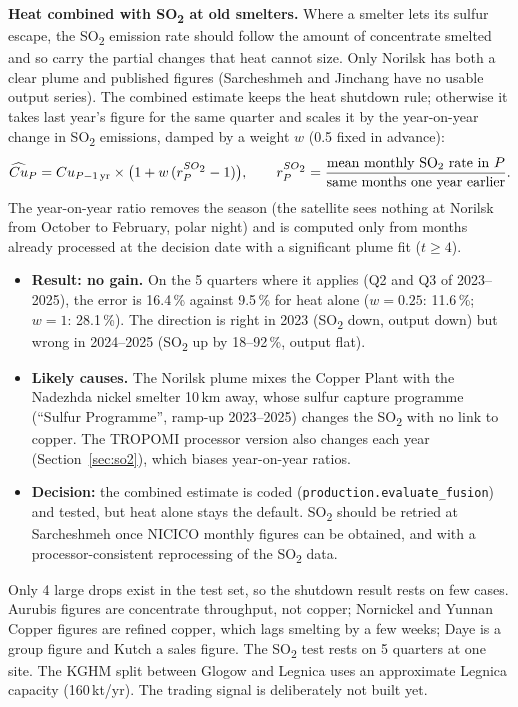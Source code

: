 \documentclass[10pt,a4paper]{article}
\newcommand{\SOtwo}{SO\textsubscript{2}}
\newcommand{\code}[1]{\texttt{\small #1}}
\begin{document}
\textbf{Heat combined with \SOtwo{} at old smelters.} Where a smelter lets its sulfur escape, the \SOtwo{} emission rate should follow the amount of concentrate smelted and so carry the partial changes that heat cannot size. Only Norilsk has both a clear plume and published figures (Sarcheshmeh and Jinchang have no usable output series). The combined estimate keeps the heat shutdown rule; otherwise it takes last year's figure for the same quarter and scales it by the year-on-year change in \SOtwo{} emissions, damped by a weight $w$ (0.5 fixed in advance):
\[
\widehat{Cu}_P = Cu_{P-1\,\text{yr}}\times\bigl(1 + w\,(r^{\SOtwo}_P-1)\bigr),\qquad r^{\SOtwo}_P=\frac{\text{mean monthly \SOtwo{} rate in }P}{\text{same months one year earlier}}.
\]
The year-on-year ratio removes the season (the satellite sees nothing at Norilsk from October to February, polar night) and is computed only from months already processed at the decision date with a significant plume fit ($t\geq4$).
\begin{itemize}[leftmargin=1.2em]
  \item \textbf{Result: no gain.} On the 5 quarters where it applies (Q2 and Q3 of 2023--2025), the error is 16.4\,\% against 9.5\,\% for heat alone ($w=0.25$: 11.6\,\%; $w=1$: 28.1\,\%). The direction is right in 2023 (\SOtwo{} down, output down) but wrong in 2024--2025 (\SOtwo{} up by 18--92\,\%, output flat).
  \item \textbf{Likely causes.} The Norilsk plume mixes the Copper Plant with the Nadezhda nickel smelter 10\,km away, whose sulfur capture programme (``Sulfur Programme'', ramp-up 2023--2025) changes the \SOtwo{} with no link to copper. The TROPOMI processor version also changes each year (Section~\ref{sec:so2}), which biases year-on-year ratios.
  \item \textbf{Decision:} the combined estimate is coded (\code{production.evaluate\_fusion}) and tested, but heat alone stays the default. \SOtwo{} should be retried at Sarcheshmeh once NICICO monthly figures can be obtained, and with a processor-consistent reprocessing of the \SOtwo{} data.
\end{itemize}

\begin{notebox}
Only 4 large drops exist in the test set, so the shutdown result rests on few cases. Aurubis figures are concentrate throughput, not copper; Nornickel and Yunnan Copper figures are refined copper, which lags smelting by a few weeks; Daye is a group figure and Kutch a sales figure. The \SOtwo{} test rests on 5 quarters at one site. The KGHM split between Glogow and Legnica uses an approximate Legnica capacity (160\,kt/yr). The trading signal is deliberately not built yet.
\end{notebox}
\end{document}
